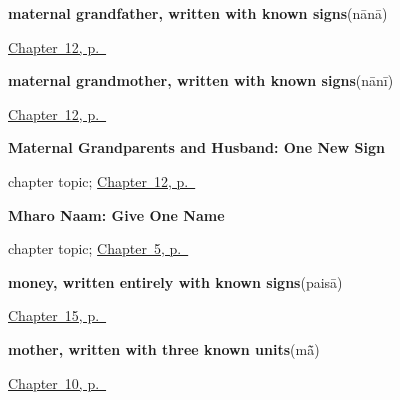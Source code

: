 \noindent\begin{minipage}[t]{\linewidth}
\raggedright
\textbf{maternal grandfather, written with known signs}\enspace\emph{}\enspace(nānā)\par
\footnotesize \hyperref[ch:mw-family-ten]{Chapter~12, p.~\pageref*{ch:mw-family-ten}}
\end{minipage}\par\smallskip

\noindent\begin{minipage}[t]{\linewidth}
\raggedright
\textbf{maternal grandmother, written with known signs}\enspace\emph{}\enspace(nānī)\par
\footnotesize \hyperref[ch:mw-family-ten]{Chapter~12, p.~\pageref*{ch:mw-family-ten}}
\end{minipage}\par\smallskip

\noindent\begin{minipage}[t]{\linewidth}
\raggedright
\textbf{Maternal Grandparents and Husband: One New Sign}\par
\footnotesize chapter topic; \hyperref[ch:mw-family-ten]{Chapter~12, p.~\pageref*{ch:mw-family-ten}}
\end{minipage}\par\smallskip

\noindent\begin{minipage}[t]{\linewidth}
\raggedright
\textbf{Mharo Naam: Give One Name}\par
\footnotesize chapter topic; \hyperref[ch:mw-name-answer]{Chapter~5, p.~\pageref*{ch:mw-name-answer}}
\end{minipage}\par\smallskip

\noindent\begin{minipage}[t]{\linewidth}
\raggedright
\textbf{money, written entirely with known signs}\enspace\emph{}\enspace(paisā)\par
\footnotesize \hyperref[ch:mw-travel-five]{Chapter~15, p.~\pageref*{ch:mw-travel-five}}
\end{minipage}\par\smallskip

\noindent\begin{minipage}[t]{\linewidth}
\raggedright
\textbf{mother, written with three known units}\enspace\emph{}\enspace(mā̃)\par
\footnotesize \hyperref[ch:mw-family-four]{Chapter~10, p.~\pageref*{ch:mw-family-four}}
\end{minipage}\par\smallskip

